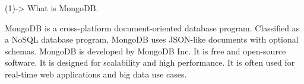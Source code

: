 (1)-> What is MongoDB.
     
     
      MongoDB is a cross-platform document-oriented database program. 
 Classified as a NoSQL database program, MongoDB uses JSON-like documents with optional schemas.
 MongoDB is developed by MongoDB Inc. It is free and open-source software. 
 It is designed for scalability and high performance.
 It is often used for real-time web applications and big data use cases.